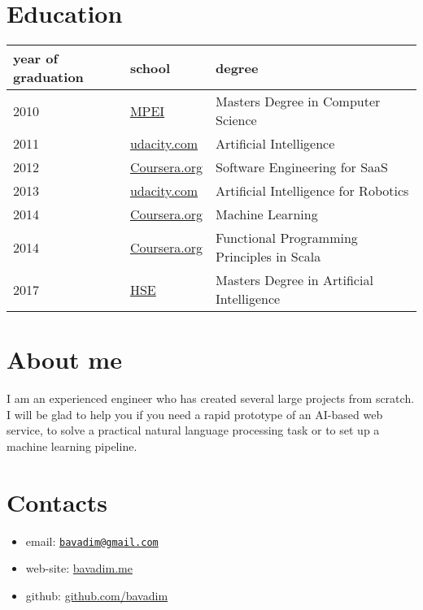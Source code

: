 \documentclass{article}
\begin{document}
\section{Education}

\begin{longtable}[]{@{}lll@{}}
  \toprule
  year of graduation & school & degree\tabularnewline
  \midrule
  \endhead
  2010 & \href{https://mpei.ru/lang/en/Pages/default.aspx}{MPEI} & Masters
  Degree in Computer Science\tabularnewline
  2011 & \href{https://www.udacity.com}{udacity.com} & Artificial
  Intelligence\tabularnewline
  2012 & \href{https://www.coursera.org}{Coursera.org} & Software
  Engineering for SaaS\tabularnewline
  2013 & \href{https://www.udacity.com}{udacity.com} & Artificial
  Intelligence for Robotics\tabularnewline
  2014 & \href{https://www.coursera.org}{Coursera.org} & Machine
  Learning\tabularnewline
  2014 & \href{https://www.coursera.org}{Coursera.org} & Functional
  Programming Principles in Scala\tabularnewline
  2017 & \href{https://www.hse.ru/}{HSE} & Masters Degree in Artificial
  Intelligence\tabularnewline
  \bottomrule
\end{longtable}

\section{About me}

I am an experienced engineer who has created several large projects from
scratch. I will be glad to help you if you need a rapid prototype of an
AI-based web service, to solve a practical natural language processing
task or to set up a machine learning pipeline.

\section{Contacts}

\begin{itemize}
    \tightlist
  \item
    email: \href{mailto:bavadim@gmail.com}{\nolinkurl{bavadim@gmail.com}}
  \item
    web-site: \href{http://bavadim.me}{bavadim.me}
  \item
    github: \href{https://github.com/bavadim/}{github.com/bavadim}
\end{itemize}
\end{document}
